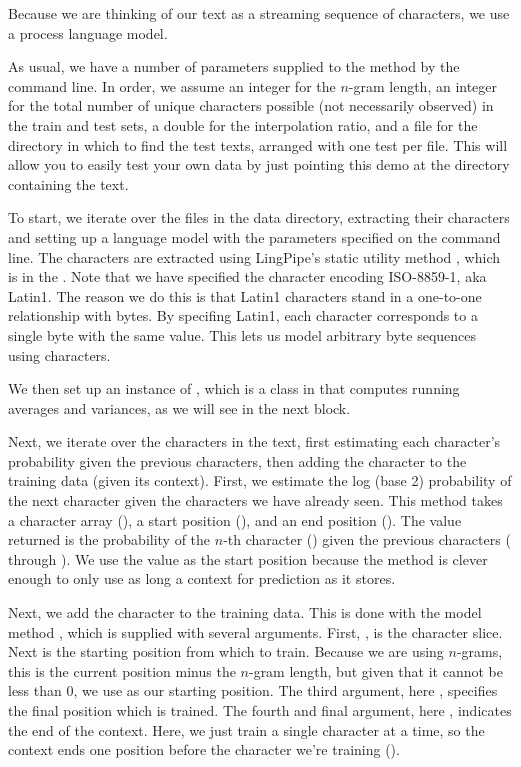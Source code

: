 Because we are thinking of our text as a streaming sequence of
characters, we use a process language model.  

As usual, we have a number of parameters supplied to the 
method by the command line.  In order, we assume an integer
 for the $n$-gram length, an integer  for
the total number of unique characters possible (not necessarily
observed) in the train and test sets, a double  for
the interpolation ratio, and a file  for the directory
in which to find the test texts, arranged with one test per file.
This will allow you to easily test your own data by just pointing this
demo at the directory containing the text.

To start, we iterate over the files in the data directory, extracting
their characters and setting up a language model with the parameters
specified on the command line.
%
%
The characters are extracted using LingPipe's static utility method
, which is in the
.  Note that we have specified the
character encoding ISO-8859-1, aka Latin1.  The reason we do this is
that Latin1 characters stand in a one-to-one relationship with bytes.
By specifing Latin1, each character corresponds to a single byte with
the same value.  This lets us model arbitrary byte sequences using
characters.  

We then set up an instance of , which
is a class in  that computes running averages
and variances, as we will see in the next block.

Next, we iterate over the characters in the text, first estimating 
each character's probability given the previous characters, then
adding the character to the training data (given its context).
%
%
First, we estimate the log (base 2) probability of the next character
given the characters we have already seen.  This method takes a
character array (), a start position (), and an end
position ().  The value returned is the probability of the
$n$-th character () given the previous characters
( through ).  We use the value  as
the start position because the method is clever enough to only use as
long a context for prediction as it stores.

Next, we add the character to the training data.  This is done with
the model method , which is supplied with several
arguments.  First, , is the character slice.  Next is the
starting position from which to train.  Because we are using
$n$-grams, this is the current position minus the $n$-gram length, but
given that it cannot be less than 0, we use 
as our starting position.  The third argument, here , specifies
the final position which is trained.  The fourth and final argument,
here , indicates the end of the context.  Here,
we just train a single character at a time, so the context ends one
position before the character we're training ().


